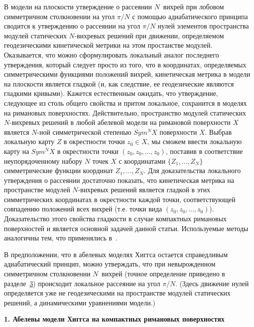 В модели на плоскости утверждение о рассеянии $N$~вихрей при лобовом симметричном столкновении на угол $\pi/N$ с помощью адиабатического принципа сводится к утверждению о рассеянии на угол $\pi/N$ нулей элементов пространства модулей статических $N$-вихревых решений при движении, определяемом геодезическими кинетической метрики на этом простанстве модулей. Оказывается, что можно сформулировать локальный аналог последнего утверждения, который следует просто из того, что в координатах, определяемых симметрическими функциями положений вихрей, кинетическая метрика в модели на плоскости является гладкой (и, как следствие, ее геодезические являются гладкими кривыми). Кажется естественным ожидать, что утверждение, следующее из столь общего свойства и притом локальное, сохранится в моделях на римановых поверхностях. Действительно, пространство модулей статических $N$-вихревых решений в любой абелевой модели на римановой поверхности $X$ является $N$-ной симметрической степенью $Sym^NX$ поверхности $X$.  Выбрав локальную карту $Z$ в окрестности точки $z_0\in X$, мы сможем ввести локальную карту на $Sym^NX$ в окрестности точки $(z_0,z_0,\dots,z_0)$, поставив в соответствие неупорядоченному набору $N$ точек $X$ с координатами $\{Z_1,\dots,Z_N\}$ симметрические функции координат $Z_1,\dots,Z_N$. Для доказательства локального утверждения о рассеянии достаточно показать, что кинетическая метрика на пространстве модулей $N$-вихревых решений является гладкой в этих симметрических координатах в окрестности  каждой точки, соответствующей совпадению положений всех вихрей (т.е. точки вида $(z_0,z_0,\dots,z_0)$). Доказательство этого свойства гладкости в случае компактных римановых поверхностей и является основной задачей данной статьи. Используемые методы аналогичны тем, что применялись в~\cite{palv:palvelev1}. 



В предположении, что в абелевых моделях Хиггса остается справедливым адиабатический принцип, можно утверждать, что при невырожденном симметричном столкновении $N$~вихрей (точное определение приведено в разделе~\hyperlink{localscattering}{3}) происходит локальное рассеяние на угол $\pi/N$. (Здесь движение нулей определяется уже не геодезическими на пространстве модулей статических решений, а динамическими уравнениями модели.)



\smallskip



\textbf{1. Абелевы модели Хиггса на компактных римановых поверхностях}



